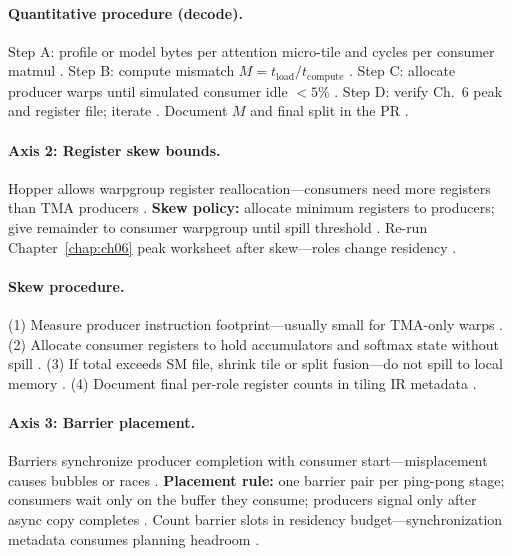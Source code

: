 \paragraph{Quantitative procedure (decode).}
Step A: profile or model bytes per attention micro-tile and cycles per consumer matmul \citep{shah2024flashattention3,patel2025llminference}.
Step B: compute mismatch $M = t_{\mathrm{load}} / t_{\mathrm{compute}}$ \citep{memoryfloor2026}.
Step C: allocate producer warps until simulated consumer idle $\lt 5\%$ \citep{yirage2026,shah2024flashattention3}.
Step D: verify Ch.~6 peak and register file; iterate \citep{dao2022flashattention,chen2020compilerbasedhardw}.
Document $M$ and final split in the PR \citep{taxbreak2026,patel2025llminference}.

\paragraph{Axis 2: Register skew bounds.}
Hopper allows warpgroup register reallocation---consumers need more registers than TMA producers \citep{shah2024flashattention3,nvidia2022hopper}.
\textbf{Skew policy:} allocate minimum registers to producers; give remainder to consumer warpgroup until spill threshold \citep{memoryfloor2026,dao2022flashattention}.
Re-run Chapter~\ref{chap:ch06} peak worksheet after skew---roles change residency \citep{yirage2026,chen2020compilerbasedhardw}.

\paragraph{Skew procedure.}
(1) Measure producer instruction footprint---usually small for TMA-only warps \citep{semianalysis2024tma,shah2024flashattention3}.
(2) Allocate consumer registers to hold accumulators and softmax state without spill \citep{dao2022flashattention,nvidia2022hopper}.
(3) If total exceeds SM file, shrink tile or split fusion---do not spill to local memory \citep{memoryfloor2026,yirage2026}.
(4) Document final per-role register counts in tiling IR metadata \citep{chen2020compilerbasedhardw,wu2024mirage}.

\paragraph{Axis 3: Barrier placement.}
Barriers synchronize producer completion with consumer start---misplacement causes bubbles or races \citep{shah2024flashattention3,semianalysis2024tma}.
\textbf{Placement rule:} one barrier pair per ping-pong stage; consumers wait only on the buffer they consume; producers signal only after async copy completes \citep{nvidia2022hopper,yirage2026}.
Count barrier slots in residency budget---synchronization metadata consumes planning headroom \citep{chen2020compilerbasedhardw}.

